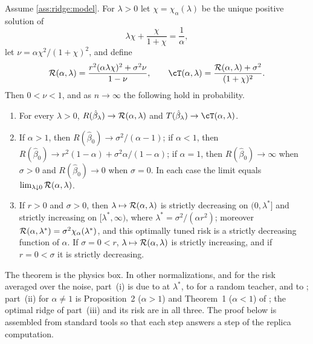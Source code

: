\begin{refsection}
\begin{theorem}\label{thm:ridge:risk}
Assume \cref{ass:ridge:model}. For $\lambda>0$ let $\chi=\chi_\alpha(\lambda)$ be the unique positive solution of
\begin{equation}\label{eq:ridge:chi}
\lambda\chi+\frac{\chi}{1+\chi}=\frac1\alpha,
\end{equation}
let $\nu=\alpha\chi^2/(1+\chi)^2$, and define
\begin{equation}\label{eq:ridge:risk}
\ridgeR(\alpha,\lambda)=\frac{r^2(\alpha\lambda\chi)^2+\sigma^2\nu}{1-\nu},\qquad\cT(\alpha,\lambda)=\frac{\ridgeR(\alpha,\lambda)+\sigma^2}{(1+\chi)^2}.
\end{equation}
Then $0<\nu<1$, and as $n\to\infty$ the following hold in probability.
\begin{enumerate}
\item For every $\lambda>0$, $R(\hat\beta_\lambda)\to\mathcal{R}(\alpha,\lambda)$ and $T(\hat\beta_\lambda)\to\cT(\alpha,\lambda)$.
\item If $\alpha>1$, then $R(\hat\beta_0)\to\sigma^2/(\alpha-1)$; if $\alpha<1$, then $R(\hat\beta_0)\to r^2(1-\alpha)+\sigma^2\alpha/(1-\alpha)$; if $\alpha=1$, then $R(\hat\beta_0)\to\infty$ when $\sigma>0$ and $R(\hat\beta_0)\to0$ when $\sigma=0$. In each case the limit equals $\lim_{\lambda\downarrow0}\mathcal{R}(\alpha,\lambda)$.
\item If $r>0$ and $\sigma>0$, then $\lambda\mapsto\mathcal{R}(\alpha,\lambda)$ is strictly decreasing on $(0,\lambda^*]$ and strictly increasing on $[\lambda^*,\infty)$, where $\lambda^*=\sigma^2/(\alpha r^2)$; moreover $\mathcal{R}(\alpha,\lambda^*)=\sigma^2\chi_\alpha(\lambda^*)$, and this optimally tuned risk is a strictly decreasing function of $\alpha$. If $\sigma=0<r$, $\lambda\mapsto\mathcal{R}(\alpha,\lambda)$ is strictly increasing, and if $r=0<\sigma$ it is strictly decreasing.
\end{enumerate}
\end{theorem}

The theorem is the physics box. In other normalizations, and for the risk averaged over the noise, part~(i) is due to \textcite{Dicker2016} at $\lambda^*$, to \textcite{DobribanWager2018} for a random teacher, and to \textcite[Corollary~6]{HastieEtAl2022}; part~(ii) for $\alpha\ne1$ is Proposition~2 ($\alpha>1$) and Theorem~1 ($\alpha<1$) of \textcite{HastieEtAl2022}; the optimal ridge of part~(iii) and its risk are in all three. The proof below is assembled from standard tools so that each step answers a step of the replica computation.


\end{refsection}
